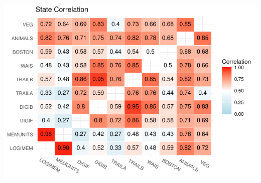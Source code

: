 \documentclass[
]{article}
\begin{document}
\includegraphics{DataAnalysis_files/figure-latex/unnamed-chunk-4-1.pdf}
\end{document}
